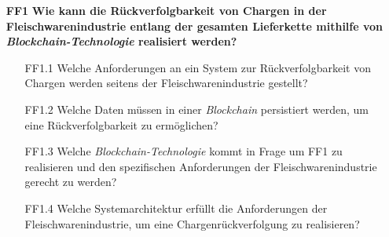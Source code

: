 \begin{itemize}
  \item[\textbf{FF1}] \textbf{Wie kann die Rückverfolgbarkeit von Chargen in der Fleischwarenindustrie entlang der gesamten Lieferkette mithilfe von \textit{Blockchain-Technologie} realisiert werden?}
  \begin{itemize}
    \item[FF1.1] Welche Anforderungen an ein System zur Rückverfolgbarkeit von Chargen werden seitens der Fleischwarenindustrie gestellt?
    \item[FF1.2] Welche Daten müssen in einer \textit{Blockchain} persistiert werden, um eine Rückverfolgbarkeit zu ermöglichen?
    \item[FF1.3] Welche \textit{Blockchain-Technologie} kommt in Frage um FF1 zu realisieren und den spezifischen Anforderungen der Fleischwarenindustrie gerecht zu werden?
    \item[FF1.4] Welche Systemarchitektur erfüllt die Anforderungen der Fleischwarenindustrie, um eine Chargenrückverfolgung zu realisieren?
  \end{itemize}
\end{itemize}


\newpage
